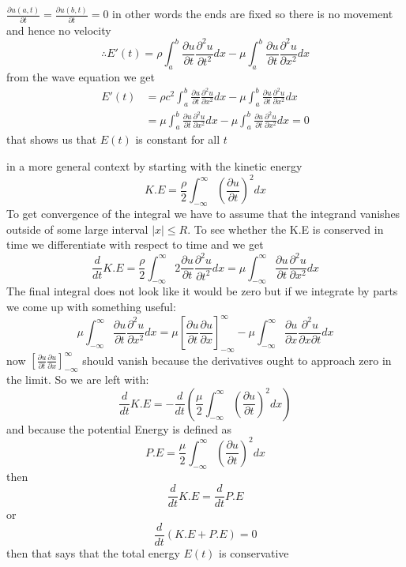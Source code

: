 \documentclass[]{article}
\begin{document}
$\displaystyle \frac{\partial u(a,t)}{\partial t} = \frac{\partial u(b,t)}{\partial t} = 0$
in other words the ends are fixed so there is no movement and hence no velocity
\[
\therefore E'(t) = \rho \int_{a}^{b} \frac{\partial u}{\partial t}\frac{\partial^2 u}{\partial t^2} dx -\mu \int_{a}^{b} \frac{\partial u}{\partial t}\frac{\partial^2 u}{\partial x^2} dx    
\]
from the wave equation we get 
\begin{align*}
    E'(t) &= \rho c^2 \int_{a}^{b} \frac{\partial u}{\partial t}\frac{\partial^2 u}{\partial x^2} dx -\mu \int_{a}^{b} \frac{\partial u}{\partial t}\frac{\partial^2 u}{\partial x^2} dx    
    \\
    &= \mu \int_{a}^{b} \frac{\partial u}{\partial t}\frac{\partial^2 u}{\partial x^2} dx -\mu \int_{a}^{b} \frac{\partial u}{\partial t}\frac{\partial^2 u}{\partial x^2} dx = 0
\end{align*}
that shows us that $E(t)$ is constant for all $t$
\par
in a more general context by starting with the kinetic energy
\[
K.E = \frac{\rho}{2} \int_{-\infty}^{\infty} {\left(\frac{\partial u}{\partial t}\right)}^2 dx    
\]
To get convergence of the integral we have to assume that the integrand vanishes
outside of some large interval $|x| \leq R$.
To see whether the K.E is conserved in time
we differentiate with respect to time and we get
\[
\frac{d}{dt}K.E = \frac{\rho}{2} \int_{-\infty}^{\infty} 2\frac{\partial u}{\partial t}\frac{\partial^2 u}{\partial t^2} dx = \mu \int_{-\infty}^{\infty} \frac{\partial u}{\partial t}\frac{\partial^2 u}{\partial x^2} dx
\]
The final integral does not look like it would be zero but if we integrate by
parts we come up with something useful:
\[
    \mu \int_{-\infty}^{\infty} \frac{\partial u}{\partial t}\frac{\partial^2 u}{\partial x^2} dx = \mu \left[\frac{\partial u}{\partial t}\frac{\partial u}{\partial x}\right]_{-\infty}^{\infty} - \mu \int_{-\infty}^{\infty} \frac{\partial u}{\partial x}\frac{\partial^2 u}{\partial x \partial t} dx
\]
now $\displaystyle \left[\frac{\partial u}{\partial t}\frac{\partial u}{\partial x}\right]_{-\infty}^{\infty} $ should vanish because the derivatives ought to approach zero in the limit. So we are left with:
\[
\frac{d}{dt}K.E = -\frac{d}{dt}\left(\frac{\mu}{2} \int_{-\infty}^{\infty} {\left(\frac{\partial u}{\partial t}\right)}^2 dx\right)
\]
and because the potential Energy is defined as 
\[
P.E = \frac{\mu}{2} \int_{-\infty}^{\infty} {\left(\frac{\partial u}{\partial t}\right)}^2 dx
\]
then 
\[
   \frac{d}{dt}K.E = \frac{d}{dt}P.E 
\]
or 
\[
\frac{d}{dt} \left(K.E + P.E \right) = 0    
\]
then that says that the total energy $E(t)$ is conservative
\end{document}
